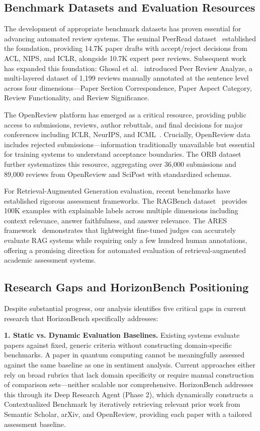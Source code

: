 \subsection{Benchmark Datasets and Evaluation Resources}

The development of appropriate benchmark datasets has proven essential for advancing automated review systems. The seminal PeerRead dataset~\cite{kang2018peerread} established the foundation, providing 14.7K paper drafts with accept/reject decisions from ACL, NIPS, and ICLR, alongside 10.7K expert peer reviews. Subsequent work has expanded this foundation: Ghosal et al.~\cite{ghosal2022peer} introduced Peer Review Analyze, a multi-layered dataset of 1,199 reviews manually annotated at the sentence level across four dimensions—Paper Section Correspondence, Paper Aspect Category, Review Functionality, and Review Significance.

The OpenReview platform has emerged as a critical resource, providing public access to submissions, reviews, author rebuttals, and final decisions for major conferences including ICLR, NeurIPS, and ICML~\cite{openreview}. Crucially, OpenReview data includes rejected submissions—information traditionally unavailable but essential for training systems to understand acceptance boundaries. The ORB dataset~\cite{orb2023} further systematizes this resource, aggregating over 36,000 submissions and 89,000 reviews from OpenReview and SciPost with standardized schemas.

For Retrieval-Augmented Generation evaluation, recent benchmarks have established rigorous assessment frameworks. The RAGBench dataset~\cite{ragbench2024} provides 100K examples with explainable labels across multiple dimensions including context relevance, answer faithfulness, and answer relevance. The ARES framework~\cite{ares2024} demonstrates that lightweight fine-tuned judges can accurately evaluate RAG systems while requiring only a few hundred human annotations, offering a promising direction for automated evaluation of retrieval-augmented academic assessment systems.

\subsection{Research Gaps and HorizonBench Positioning}

Despite substantial progress, our analysis identifies five critical gaps in current research that HorizonBench specifically addresses:

\textbf{1. Static vs. Dynamic Evaluation Baselines.} Existing systems evaluate papers against fixed, generic criteria without constructing domain-specific benchmarks. A paper in quantum computing cannot be meaningfully assessed against the same baseline as one in sentiment analysis. Current approaches either rely on broad rubrics that lack domain specificity or require manual construction of comparison sets—neither scalable nor comprehensive. HorizonBench addresses this through its Deep Research Agent (Phase 2), which dynamically constructs a Contextualized Benchmark by iteratively retrieving relevant prior work from Semantic Scholar, arXiv, and OpenReview, providing each paper with a tailored assessment baseline.

